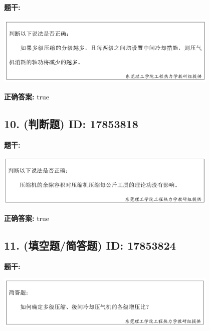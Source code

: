 \documentclass[12pt]{article}
\begin{document}
\textbf{题干:}


\begin{center}\includegraphics[width=0.8\textwidth, height=0.25\textheight, keepaspectratio]{question_9_17853819/title_img_1.png}\end{center}

\textbf{正确答案:}
true

\vspace{0.5em}\hrulefill\vspace{1em}

\subsection*{10. (判断题) \small ID: 17853818}

\textbf{题干:}


\begin{center}\includegraphics[width=0.8\textwidth, height=0.25\textheight, keepaspectratio]{question_10_17853818/title_img_1.png}\end{center}

\textbf{正确答案:}
true

\vspace{0.5em}\hrulefill\vspace{1em}

\subsection*{11. (填空题/简答题) \small ID: 17853824}

\textbf{题干:}


\begin{center}\includegraphics[width=0.8\textwidth, height=0.25\textheight, keepaspectratio]{question_11_17853824/title_img_1.png}\end{center}
\end{document}
